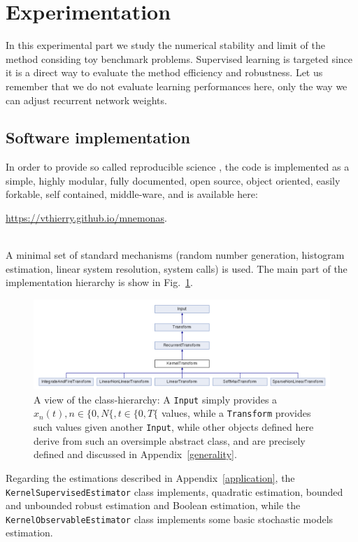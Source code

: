 
\section{Experimentation}

In this experimental part we study the numerical stability and limit of the method considing toy benchmark problems. Supervised learning is targeted since it is a direct way to evaluate the method efficiency and robustness. Let us remember that we do not evaluate learning performances here, only the way we can adjust recurrent network weights.

\subsection*{Software implementation}

In order to provide so called reproducible science \cite{topalidou_long_2015}, the code is implemented as a simple, highly modular, fully documented, open source, object oriented, easily forkable, self contained, middle-ware, and is available here: 
\\\centerline{\href{https://vthierry.github.io/mnemonas}{https://vthierry.github.io/mnemonas}.}\\ 
A minimal set of standard mechanisms (random number generation, histogram estimation, linear system resolution, system calls) is used. The main part of the implementation hierarchy is show in Fig.~\ref{class-hierarchy}. 

\begin{figure}[!ht]
  \includegraphics[width=\textwidth]{img/class-hierarchy}
  \caption{A view of the class-hierarchy: A {\tt Input} simply provides a $x_n(t), n \in \{0, N\{, t \in \{0, T\{$ values, while a {\tt Transform} provides such values given another {\tt Input}, while other objects defined here derive from such an oversimple abstract class, and are precisely defined and discussed in Appendix~\ref{generality}.}
  \label{class-hierarchy}
\end{figure}

Regarding the estimations described in Appendix~\ref{application}, the {\tt KernelSupervisedEstimator} class implements, quadratic estimation, bounded and unbounded robust estimation and Boolean estimation, while the {\tt KernelObservableEstimator} class implements some basic stochastic models estimation.

